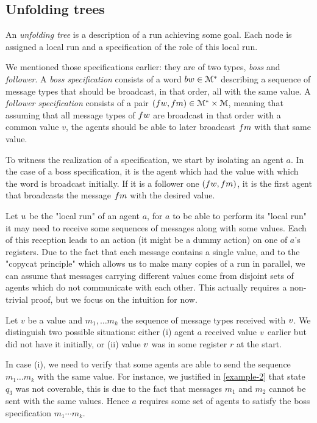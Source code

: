 \subsection{Unfolding trees}
\label{sec:decidability-tree-unfoldings}

An \emph{unfolding tree} is a description of a run achieving some goal. Each node is assigned a local run and a specification of the role of this local run. 

We mentioned those specifications earlier: they are of two types, \emph{boss} and \emph{follower}. A \emph{boss specification} consists of a word $\bossspec \in \messages^*$ describing a sequence of message types that should be broadcast, in that order, all with the same value. A \emph{follower specification} consists of a pair $(\followwordspec, \followmessagespec) \in \messages^*\times \messages$, meaning that assuming that all message types of $\followwordspec$ are broadcast in that order with a common value $v$, the agents should be able to later broadcast $\followmessagespec$ with that same value.

To witness the realization of a specification, we start by isolating an agent $a$. In the case of a boss specification, it is the agent which had the value with which the word is broadcast initially. If it is a follower one $(\followwordspec, \followmessagespec)$, it is the first agent that broadcasts the message $\followmessagespec$ with the desired value.

Let $u$ be the "local run" of an agent $a$, for $a$ to be able to perform its "local run" it may need to receive some sequences of messages along with some values. Each of this reception leads to an action (it might be a dummy action) on one of $a$'s registers.
Due to the fact that each message contains a single value, and to the "copycat principle" which allows us to make many copies of a run in parallel, we can assume that messages carrying different values come from disjoint sets of agents which do not communicate with each other. This actually requires a non-trivial proof, but we focus on the intuition for now.

Let $v$ be a value and $m_1, \dots m_k$ the sequence of message types received with $v$. We distinguish two possible situations: either (i) agent $a$ received value $v$ earlier but did not have it initially, or (ii) value $v$ was in some register $r$ at the start. 

 In case (i), we need to verify that some agents are able to send the sequence $m_1 \dots m_k$ with the same value. For instance, we justified in \cref{example-2} that state $q_3$ was not coverable, this is due to the fact that messages $m_1$ and $m_2$ cannot be sent with the same values. Hence $a$ requires some set of agents to satisfy the boss specification $m_1 \cdots m_k$.

